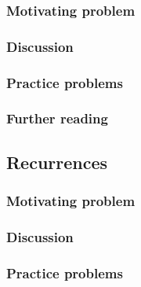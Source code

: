 \subsubsection*{Motivating problem}







\subsubsection*{Discussion}

\subsubsection*{Practice problems}

\subsubsection*{Further reading}

\subsection{Recurrences}

\subsubsection*{Motivating problem}







\subsubsection*{Discussion}

\subsubsection*{Practice problems}

